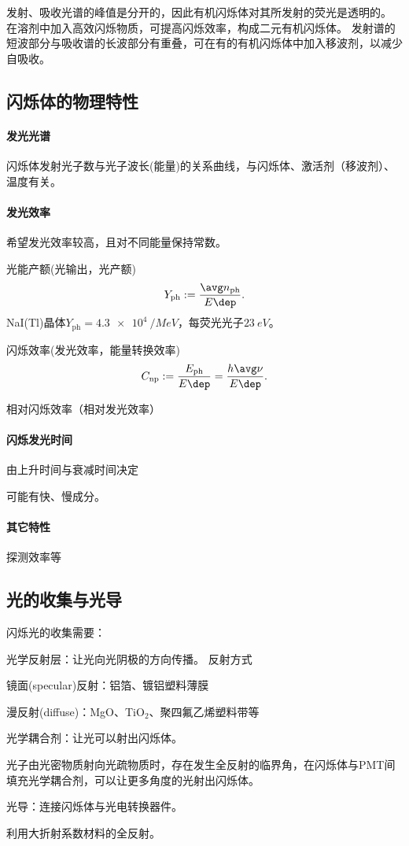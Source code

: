 发射、吸收光谱的峰值是分开的，因此有机闪烁体对其所发射的荧光是透明的。
在溶剂中加入高效闪烁物质，可提高闪烁效率，构成二元有机闪烁体。
发射谱的短波部分与吸收谱的长波部分有重叠，可在有的有机闪烁体中加入移波剂，以减少自吸收。

\subsection{闪烁体的物理特性}

\paragraph{发光光谱}
闪烁体发射光子数与光子波长(能量)的关系曲线，与闪烁体、激活剂（移波剂）、温度有关。
\paragraph{发光效率}
希望发光效率较高，且对不同能量保持常数。
\begin{compactenum}
	\item 光能产额(光输出，光产额)
	\[
		Y_{\mathrm{ph}}:=\frac{\avg n_{\mathrm{ph}}}{E\dep}.
	\]
	NaI(Tl)晶体$Y_{\mathrm{ph}}=\SI{4.3e4}{/MeV}$，每荧光光子$\SI{23}{eV}$。
	\item 闪烁效率(发光效率，能量转换效率)
	\[
		C_{\mathrm{np}}:=\frac{E_{\mathrm{ph}}}{E\dep}=\frac{h\avg\nu}{E\dep}.
	\]
	\item 相对闪烁效率（相对发光效率）
\end{compactenum}
\paragraph{闪烁发光时间}
由上升时间与衰减时间决定

可能有快、慢成分。
\paragraph{其它特性}
探测效率等

\subsection{光的收集与光导}

闪烁光的收集需要：
\begin{compactitem}
	\item 光学反射层：让光向光阴极的方向传播。
	反射方式
	\begin{compactitem}
		\item 镜面(specular)反射：铝箔、镀铝塑料薄膜
		\item 漫反射(diffuse)：MgO、TiO$_2$、聚四氟乙烯塑料带等
	\end{compactitem}
	\item 光学耦合剂：让光可以射出闪烁体。
	
	光子由光密物质射向光疏物质时，存在发生全反射的临界角，在闪烁体与PMT间填充光学耦合剂，可以让更多角度的光射出闪烁体。
	\item 光导：连接闪烁体与光电转换器件。
	
	利用大折射系数材料的全反射。
\end{compactitem}

